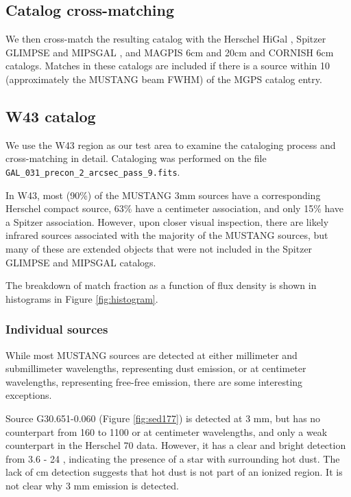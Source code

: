 \documentclass[twocolumn]{aastex62}
\begin{document}
\subsection{Catalog cross-matching}
\label{sec:catalogmatching}
We then cross-match the resulting catalog with the Herschel HiGal
\citep{Elia2017a}, Spitzer GLIMPSE and MIPSGAL
\citep{Churchwell2009a,Gutermuth2015a}, and MAGPIS 6cm and 20cm
\citep{Giveon2005a,Hoare2006a} and CORNISH 6cm \citep{Hoare2012a} catalogs.
Matches in these catalogs are included if there is a source within 10\arcsec
(approximately the MUSTANG beam FWHM) of the MGPS catalog entry.

\subsection{W43 catalog}
We use the W43 region as our test area to examine the cataloging process and
cross-matching in detail.  Cataloging was performed on the file
\texttt{GAL\_031\_precon\_2\_arcsec\_pass\_9.fits}.

In W43, most (90\%) of the MUSTANG 3mm sources have a corresponding Herschel
compact source, 63\% have a centimeter association, and only 15\% have a
Spitzer association.  However, upon closer visual inspection, there are likely
infrared sources associated with the majority of the MUSTANG sources, but many
of these are extended objects that were not included in the Spitzer GLIMPSE and
MIPSGAL catalogs.

The breakdown of match fraction as a function of flux density is shown in histograms
in Figure \ref{fig:histogram}.

\subsubsection{Individual sources}
While most MUSTANG sources are detected at either millimeter and submillimeter
wavelengths, representing dust emission, or at centimeter wavelengths,
representing free-free emission, there are some interesting exceptions.

Source G30.651-0.060 (Figure \ref{fig:sed177}) is detected at 3 mm, but has no counterpart from 160 to 1100 \um or
at centimeter wavelengths, and only a weak counterpart in the Herschel 70 \um
data. However, it has a clear and bright detection from 3.6 - 24 \um, indicating
the presence of a star with surrounding hot dust.  The lack of cm detection suggests
that hot dust is not part of an ionized region.  It is not clear why 3 mm emission
is detected.
\end{document}
